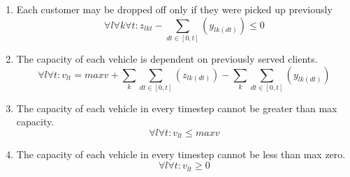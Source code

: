 \documentclass{article}
\begin{document}
\begin{enumerate}
    \item Each customer may be dropped off only if they were picked up previously
    \begin{equation}
        \forall l \forall k \forall t: z_{lkt} - \sum_{dt \in [0, t]} (y_{lk(dt)}) \leq 0
    \end{equation}

    \item The capacity of each vehicle is dependent on previously served clients.
    \begin{equation}
        \forall l \forall t: v_{lt} = maxv + \sum_k \sum_{dt \in [0, t]} (z_{lk(dt)}) - \sum_k \sum_{dt \in [0, t]} (y_{lk(dt)})
    \end{equation}

    \item The capacity of each vehicle in every timestep cannot be greater than max capacity.
    \begin{equation}
        \forall l \forall t: v_{lt} \leq maxv
    \end{equation}

    \item The capacity of each vehicle in every timestep cannot be less than max zero.
    \begin{equation}
        \forall l \forall t: v_{lt} \geq 0
    \end{equation}

\end{enumerate}
\end{document}
